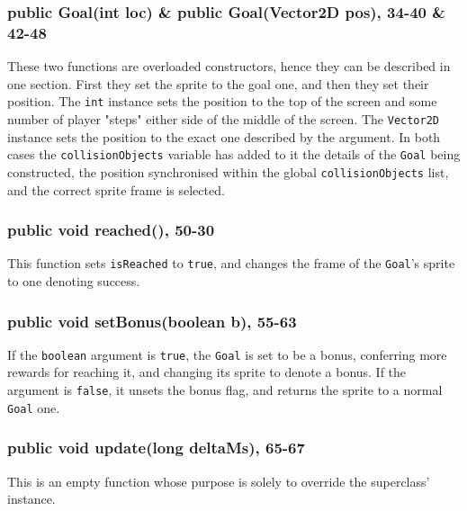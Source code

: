 \documentclass[12pt]{article}
\begin{document}
\subsubsection{public Goal(int loc) \& public Goal(Vector2D pos), 34-40 \& 42-48}
These two functions are overloaded constructors, hence they can be described in one section.
First they set the sprite to the goal one, and then they set their position.
The \verb|int| instance sets the position to the top of the screen and some number of player "steps" either side of the middle of the screen.
The \verb|Vector2D| instance sets the position to the exact one described by the argument.
In both cases the \verb|collisionObjects| variable has added to it the details of the \verb|Goal| being constructed, the position synchronised within the global \verb|collisionObjects| list, and the correct sprite frame is selected.

\subsubsection{public void reached(), 50-30}
This function sets \verb|isReached| to \verb|true|, and changes the frame of the \verb|Goal|'s sprite to one denoting success.

\subsubsection{public void setBonus(boolean b), 55-63}
If the \verb|boolean| argument is \verb|true|, the \verb|Goal| is set to be a bonus, conferring more rewards for reaching it, and changing its sprite to denote a bonus.
If the argument is \verb|false|, it unsets the bonus flag, and returns the sprite to a normal \verb|Goal| one.

\subsubsection{public void update(long deltaMs), 65-67}
This is an empty function whose purpose is solely to override the superclass' instance.
\end{document}
